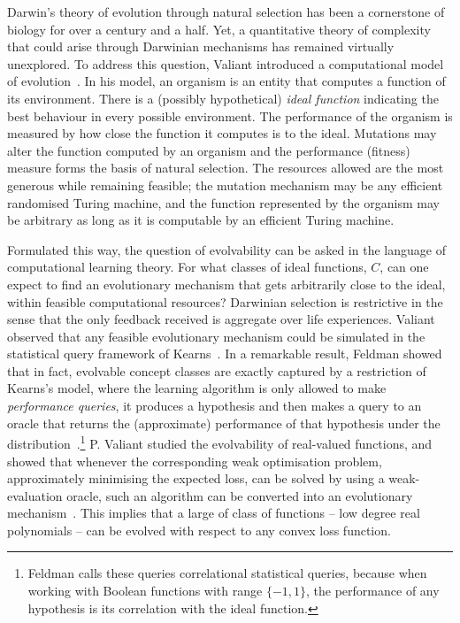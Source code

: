 Darwin's theory of evolution through natural selection has been a cornerstone of
biology for over a century and a half. Yet, a quantitative theory of complexity
that could arise through Darwinian mechanisms has remained virtually unexplored.
To address this question, Valiant introduced a computational model of
evolution~\cite{Valiant:2009-evolvability}.  In his model, an organism is an
entity that computes a function of its environment.  There is a (possibly
hypothetical) \emph{ideal function} indicating the best behaviour in every
possible environment. The performance of the organism is measured by how close
the function it computes is to the ideal. Mutations may alter the function
computed by an organism and the performance (fitness) measure forms the basis of
natural selection. The resources allowed are the most generous while remaining
feasible; the mutation mechanism may be any efficient randomised Turing machine,
and the function represented by the organism may be arbitrary as long as it is
computable by an efficient Turing machine.

Formulated this way, the question of evolvability can be asked in the language
of computational learning theory. For what classes of ideal functions, $C$, can
one expect to find an evolutionary mechanism that gets arbitrarily close to the
ideal, within feasible computational resources? Darwinian selection is
restrictive in the sense that the only feedback received is aggregate over life
experiences. Valiant observed that any feasible evolutionary mechanism could be
simulated in the statistical query framework of Kearns~\cite{Kearns:1998}. In a
remarkable result, Feldman showed that in fact, evolvable concept classes are
exactly captured by a restriction of Kearns's model, where the learning
algorithm is only allowed to make \emph{performance queries}, \ie it produces a
hypothesis and then makes a query to an oracle that returns the (approximate)
performance of that hypothesis under the
distribution~\cite{Feldman:2008-evolvability}.\footnote{Feldman calls these
queries correlational statistical queries, because when working with Boolean
functions with range $\{-1, 1\}$, the performance of any hypothesis is its
correlation with the ideal function.} P.  Valiant studied the evolvability of
real-valued functions, and showed that whenever the corresponding weak
optimisation problem, \ie approximately minimising the expected loss, can be
solved by using a weak-evaluation oracle, such an algorithm can be converted
into an evolutionary mechanism~\cite{Valiant:2012-real}. This implies that a
large of class of functions -- low degree real polynomials -- can be evolved
with respect to any convex loss function.

